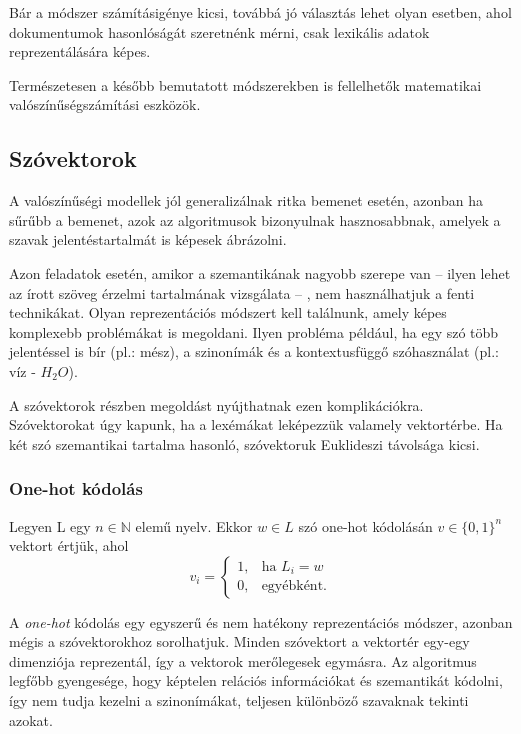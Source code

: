 Bár a módszer számításigénye kicsi, továbbá jó választás lehet olyan esetben, ahol dokumentumok hasonlóságát szeretnénk mérni, csak lexikális adatok reprezentálására képes. 

\begin{note}
	Természetesen a később bemutatott módszerekben is fellelhetők matematikai valószínűségszámítási eszközök.
\end{note}

\subsection{Szóvektorok}

A valószínűségi modellek jól generalizálnak ritka bemenet esetén, azonban ha sűrűbb a bemenet, azok az algoritmusok bizonyulnak hasznosabbnak, amelyek a szavak jelentéstartalmát is képesek ábrázolni.

Azon feladatok esetén, amikor a szemantikának nagyobb szerepe van – ilyen lehet az írott szöveg érzelmi tartalmának vizsgálata – , nem használhatjuk a fenti technikákat. Olyan reprezentációs módszert kell találnunk, amely képes komplexebb problémákat is megoldani. Ilyen probléma például, ha egy szó több jelentéssel is bír (pl.: mész), a szinonímák és a kontextusfüggő szóhasználat (pl.: víz - $H_2O$).

A szóvektorok részben megoldást nyújthatnak ezen komplikációkra. Szóvektorokat úgy kapunk, ha a lexémákat leképezzük valamely vektortérbe. Ha két szó szemantikai tartalma hasonló, szóvektoruk Euklideszi távolsága kicsi.

\subsubsection{One-hot kódolás}

\begin{definition}
Legyen L egy $n \in \mathbb{N}$ elemű nyelv. Ekkor $w \in L$ szó one-hot kódolásán $v \in \{0,1\}^n$ vektort értjük, ahol 
\[
v_i= 
\begin{cases}
1,				& \text{ha } L_i = w\\
0,              & \text{egyébként.}
\end{cases}
\]
\end{definition}

A \textit{one-hot} kódolás egy egyszerű és nem hatékony reprezentációs módszer, azonban mégis a szóvektorokhoz sorolhatjuk. Minden szóvektort a vektortér egy-egy dimenziója reprezentál, így a vektorok merőlegesek egymásra. Az algoritmus legfőbb gyengesége, hogy képtelen relációs információkat és szemantikát  kódolni, így nem tudja kezelni a szinonímákat, teljesen különböző szavaknak tekinti azokat.


